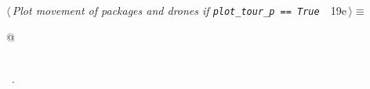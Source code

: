 \documentclass[10pt, english, oneside]{report}
\begin{document}
\begin{flushleft} \small
\begin{minipage}{\linewidth}\label{scrap21}\raggedright\small
{} $\langle\,${\itshape Plot movement of packages and drones if \verb|plot_tour_p == True |}\nobreak\ {\footnotesize {19e}}$\,\rangle\equiv$
\vspace{-1ex}
\begin{list}{}{} \item
\mbox{}\verb@   @\\
\mbox{}\verb@pass@\\
\mbox{}\verb@@{\NWsep}
\end{list}
\vspace{-1.5ex}
\footnotesize
\begin{list}{}{\setlength{\itemsep}{-\parsep}\setlength{\itemindent}{-\leftmargin}}
\item \NWtxtMacroRefIn\ .

\item{}
\end{list}
\end{minipage}\vspace{4ex}
\end{flushleft}
\end{document}
